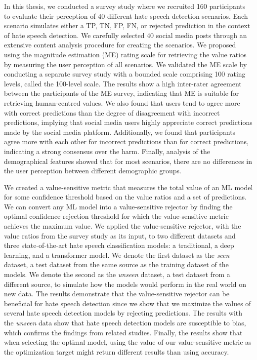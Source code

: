 %
In this thesis, we conducted a survey study where we recruited 160 participants to evaluate their perception of 40 different hate speech detection scenarios.
%
Each scenario simulates either a TP, TN, FP, FN, or rejected prediction in the context of hate speech detection.
%
We carefully selected 40 social media posts through an extensive content analysis procedure for creating the scenarios.
%
We proposed using the magnitude estimation (ME) rating scale for retrieving the value ratios by measuring the user perception of all scenarios.
%
We validated the ME scale by conducting a separate survey study with a bounded scale comprising 100 rating levels, called the 100-level scale.
%
The results show a high inter-rater agreement between the participants of the ME survey, indicating that ME is suitable for retrieving human-centred values.
%
We also found that users tend to agree more with correct predictions than the degree of disagreement with incorrect predictions, implying that social media users highly appreciate correct predictions made by the social media platform.
%
Additionally, we found that participants agree more with each other for incorrect predictions than for correct predictions, indicating a strong consensus over the harm.
%
Finally, analysis of the demographical features showed that for most scenarios, there are no differences in the user perception between different demographic groups.
%

%
We created a value-sensitive metric that measures the total value of an ML model for some confidence threshold based on the value ratios and a set of predictions.
%
We can convert any ML model into a value-sensitive rejector by finding the optimal confidence rejection threshold for which the value-sensitive metric achieves the maximum value.
%
We applied the value-sensitive rejector, with the value ratios from the survey study as its input, to two different datasets and three state-of-the-art hate speech classification models: a traditional, a deep learning, and a transformer model.
%
We denote the first dataset as the \emph{seen} dataset, a test dataset from the same source as the training dataset of the models.
%
We denote the second as the \emph{unseen} dataset, a test dataset from a different source, to simulate how the models would perform in the real world on new data.
%
The results demonstrate that the value-sensitive rejector can be beneficial for hate speech detection since we show that we maximize the values of several hate speech detection models by rejecting predictions.
%
The results with the \emph{unseen} data show that hate speech detection models are susceptible to bias, which confirms the findings from related studies.
%
Finally, the results show that when selecting the optimal model, using the value of our value-sensitive metric as the optimization target might return different results than using accuracy.
%

